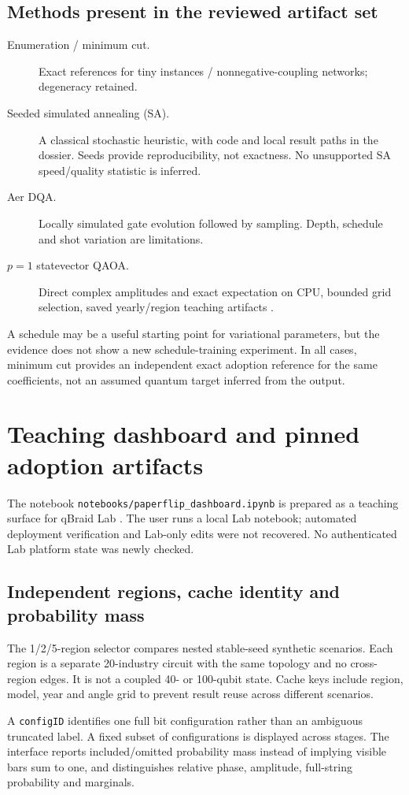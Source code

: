\documentclass[11pt,letterpaper]{article}
\newcommand{\file}[1]{\nolinkurl{#1}}
\begin{document}
\subsection{Methods present in the reviewed artifact set}
\begin{description}
 \item[Enumeration / minimum cut.] Exact references for tiny instances / nonnegative-coupling networks; degeneracy retained.
 \item[Seeded simulated annealing (SA).] A classical stochastic heuristic, with code and local result paths in the dossier. Seeds provide reproducibility, not exactness. No unsupported SA speed/quality statistic is inferred.
 \item[Aer DQA.] Locally simulated gate evolution followed by sampling. Depth, schedule and shot variation are limitations.
 \item[$p=1$ statevector QAOA.] Direct complex amplitudes and exact expectation on CPU, bounded grid selection, saved yearly/region teaching artifacts \cite{views}.
\end{description}
A schedule may be a useful starting point for variational parameters, but the evidence does not show a new schedule-training experiment. In all cases, minimum cut provides an independent exact adoption reference for the same coefficients, not an assumed quantum target inferred from the output.
\section{Teaching dashboard and pinned adoption artifacts}\label{sec:dashboard}
The notebook \file{notebooks/paperflip_dashboard.ipynb} is prepared as a teaching surface for qBraid Lab \cite{dashboard}. The user runs a local Lab notebook; automated deployment verification and Lab-only edits were not recovered. No authenticated Lab platform state was newly checked.

\subsection{Independent regions, cache identity and probability mass}
The 1/2/5-region selector compares nested stable-seed synthetic scenarios. Each region is a separate 20-industry circuit with the same topology and no cross-region edges. It is not a coupled 40- or 100-qubit state. Cache keys include region, model, year and angle grid to prevent result reuse across different scenarios.

A \file{configID} identifies one full bit configuration rather than an ambiguous truncated label. A fixed subset of configurations is displayed across stages. The interface reports included/omitted probability mass instead of implying visible bars sum to one, and distinguishes relative phase, amplitude, full-string probability and marginals.
\end{document}

